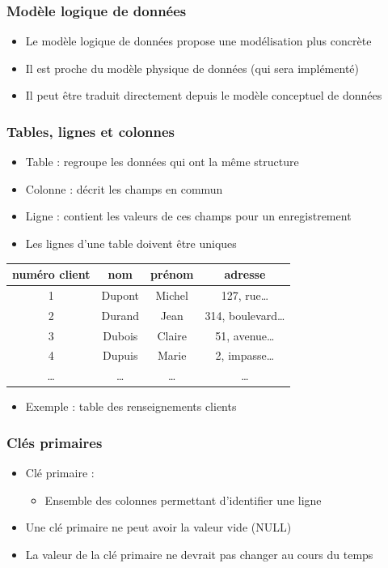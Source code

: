 \begin{frame}
  \frametitle{Modèle logique de données}
  \begin{itemize}
    \item Le modèle logique de données propose une modélisation plus concrète 
    \item Il est proche du modèle physique de données (qui sera implémenté)
    \item Il peut être traduit directement depuis le modèle conceptuel de données
  \end{itemize}
\end{frame}

\begin{frame}
  \frametitle{Tables, lignes et colonnes}
  \begin{itemize}
    \item Table : regroupe les données qui ont la même structure
    \item Colonne : décrit les champs en commun
    \item Ligne : contient les valeurs de ces champs pour un enregistrement
    \item Les lignes d'une table doivent être uniques
  \end{itemize}
  \begin{tabular}{c | c | c | c}
    numéro client & nom & prénom & adresse \\
    \hline \hline
    1 & Dupont & Michel & 127, rue\ldots \\
    2 & Durand & Jean & 314, boulevard\ldots \\
    3 & Dubois & Claire & 51, avenue\ldots \\
    4 & Dupuis & Marie & 2, impasse\ldots \\
    \ldots & \ldots & \ldots & \ldots
  \end{tabular}
  \begin{itemize}
    \item Exemple : table des renseignements clients
  \end{itemize}
\end{frame}

\begin{frame}
  \frametitle{Clés primaires}
  \begin{itemize}
    \item Clé primaire :
        \begin{itemize}
            \item Ensemble des colonnes permettant d'identifier une ligne
        \end{itemize}
    \item Une clé primaire ne peut avoir la valeur vide (NULL)
    \item La valeur de la clé primaire ne devrait pas changer au cours du temps
  \end{itemize}
\end{frame}

